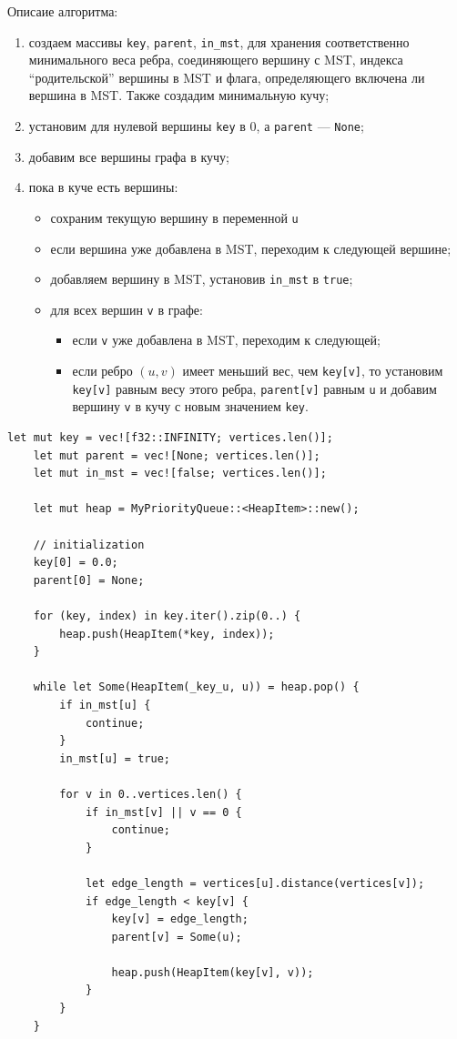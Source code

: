 Описаие алгоритма:
\begin{enumerate}
	\item создаем массивы \texttt{key}, \texttt{parent}, \texttt{in\_mst}, для хранения соответственно минимального веса ребра, соединяющего вершину с MST, индекса ``родительской'' вершины в MST и флага, определяющего включена ли вершина в MST. Также создадим минимальную кучу;
	\item установим для нулевой вершины \texttt{key} в $0$, а \texttt{parent} --- \texttt{None};
	\item добавим все вершины графа в кучу;
	\item пока в куче есть вершины:
	      \begin{itemize}
		      \item сохраним текущую вершину в переменной \texttt{u}
		      \item если вершина уже добавлена в MST, переходим к следующей вершине;
		      \item добавляем вершину в MST, установив \texttt{in\_mst} в \texttt{true};
		      \item для всех вершин \texttt{v} в графе:
		            \begin{itemize}
			            \item если \texttt{v} уже  добавлена в MST, переходим к следующей;
			            \item если ребро $(u, v)$ имеет меньший вес, чем \texttt{key[v]}, то установим \texttt{key[v]} равным весу этого ребра, \texttt{parent[v]} равным \texttt{u} и добавим вершину \texttt{v} в кучу с новым значением \texttt{key}.
		            \end{itemize}
	      \end{itemize}
\end{enumerate}

\begin{lstlisting}[caption=Реализация алгоритма Прима на Rust]
    let mut key = vec![f32::INFINITY; vertices.len()];
    let mut parent = vec![None; vertices.len()];
    let mut in_mst = vec![false; vertices.len()];

    let mut heap = MyPriorityQueue::<HeapItem>::new();

    // initialization
    key[0] = 0.0;
    parent[0] = None;

    for (key, index) in key.iter().zip(0..) {
        heap.push(HeapItem(*key, index));
    }

    while let Some(HeapItem(_key_u, u)) = heap.pop() {
        if in_mst[u] {
            continue;
        }
        in_mst[u] = true;

        for v in 0..vertices.len() {
            if in_mst[v] || v == 0 {
                continue;
            }

            let edge_length = vertices[u].distance(vertices[v]);
            if edge_length < key[v] {
                key[v] = edge_length;
                parent[v] = Some(u);

                heap.push(HeapItem(key[v], v));
            }
        }
    }

\end{lstlisting}

